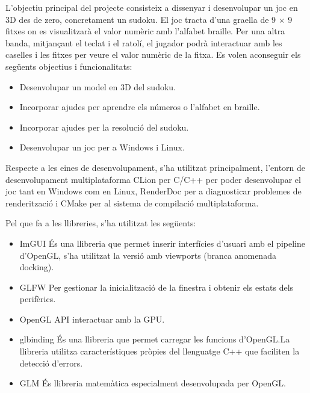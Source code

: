 ﻿\documentclass[10pt,a4paper,twocolumn,twoside]{article}
\begin{document}
L'objectiu principal del projecte consisteix a dissenyar i desenvolupar un joc en 3D des de zero,
concretament un sudoku. El joc tracta d'una graella de 9 $\times$ 9 fitxes on es visualitzarà el
valor numèric amb l'alfabet braille. Per una altra banda, mitjançant el teclat i el ratolí, el
jugador podrà interactuar amb les caselles i les fitxes per veure el valor numèric de la fitxa. Es
volen aconseguir els següents objectius i funcionalitats:
\begin{itemize}
    \item Desenvolupar un model en 3D del sudoku.
    \item Incorporar ajudes per aprendre els números o l'alfabet en braille.
    \item Incorporar ajudes per la resolució del sudoku.
    \item Desenvolupar un joc per a Windows i Linux.
\end{itemize}


Respecte a les eines de desenvolupament, s'ha utilitzat principalment, l'entorn de desenvolupament
multiplataforma CLion\cite{CLion} per C/C++ per poder desenvolupar el joc tant en Windows com en
Linux, RenderDoc\cite{RenderDoc} per a diagnosticar problemes de renderització i CMake\cite{CMake}
per al sistema de compilació multiplataforma.

Pel que fa a les llibreries, s'ha utilitzat les següents:
\begin{itemize}
    \item ImGUI\cite{ImGUI} És una llibreria que permet inserir interfícies d'usuari amb el pipeline
          d'OpenGL, s'ha utilitzat la versió amb viewports (branca anomenada docking).\@
    \item GLFW\cite{GLFW} Per gestionar la inicialització de la finestra i obtenir els estats dels
          perifèrics.\@
    \item OpenGL\cite{OpenGL} API interactuar amb la GPU.\@
    \item glbinding\cite{glbinding} És una llibreria que permet carregar les funcions d'OpenGL.\@ La
          llibreria utilitza característiques pròpies del llenguatge C++ que faciliten la detecció
          d'errors.\@
    \item GLM\cite{GLM} És llibreria matemàtica especialment desenvolupada per OpenGL.\@
\end{itemize}
\end{document}
